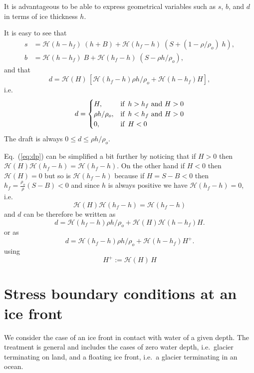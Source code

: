 \documentclass[10pt,a4paper]{book}
\newcommand{\He}{\mathcal{H}}
\begin{document}
It is advantageous to be able to express geometrical variables such as $s$, $b$, and $d$ in terms of ice
thickness $h$.  

It is easy to see that
\begin{align}
s&= \He(h-h_f) \; (h+ B) + \He(h_f-h) \; (S+(1-\rho/\rho_o)\; h ) ,\label{eq:sh} \\
b&=\He(h-h_f) \; B + \He(h_f-h) \; (S-\rho h/\rho_o), \label{eq:bh}
\end{align}
and that
\begin{equation}
d= \He(H) \, [ \He(h_f-h) \rho h/\rho_o + \He(h-h_f) H ] ,
\label{eq:dp}
\end{equation}
i.e.\ 
\[
d=\begin{cases} 
H , & \mbox{if } \, h>h_f \mbox{ and } H>0 \\  
\rho h /\rho_o , & \hbox{if } \,  h<h_f \mbox{ and } H>0\\
0 , & \hbox{if } \,  H<0  \
\end{cases}
\]
The draft is always $0\le d \le \rho h /\rho_o $.

Eq.~(\ref{eq:dp}) can be simplified a bit further by noticing that 
if $H>0$ then $\He(H) \He(h_f-h)=\He(h_f-h)$. On the other
hand if $H<0$ then $\He(H)=0$ but so is $\He(h_f-h)$ because if $H=S-B<0$ then 
$h_f=\frac{\rho_o}{\rho}(S-B) < 0$ and since $h$ is always positive we have
$\He(h_f-h)=0$, i.e.\
\[
\He(H) \He(h_f-h)=\He(h_f-h)
\]
and $d$ can be therefore be written as
\begin{equation}
d=  \He(h_f-h) \rho h/\rho_o + \He(H) \He(h-h_f) H .
\label{eq:dp2}
\end{equation}
or as
\begin{equation}
d=  \He(h_f-h) \rho h/\rho_o + \He(h-h_f) H^{+} .
\label{eq:dp3}
\end{equation}
using
\[
H^{+}:= \He(H) \, H
\]





\section{Stress boundary conditions at an ice front}

We consider the case of an ice front in contact with water of a given
depth. The treatment is general and includes the cases of zero water
depth, i.e.\ glacier terminating on land, and a floating ice front,
i.e.\ a glacier terminating in an ocean.
\end{document}
